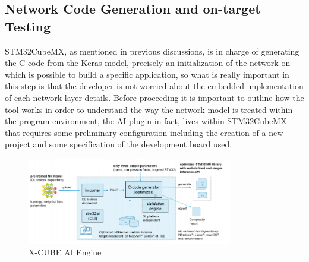 \subsection{Network Code Generation and on-target Testing}
STM32CubeMX, as mentioned in previous discussions, is in charge of generating the C-code from the Keras model, precisely an initialization of the network on which is possible to build a specific application, so what is really important in this step is that the developer is not worried about the embedded implementation of each network layer details.\newline
Before proceeding it is important to outline how the tool works in order to understand the way the network model is treated within the program environment, the AI plugin in fact, lives within STM32CubeMX that requires some preliminary configuration including the creation of a new project and some specification of the development board used.

\begin{figure}[H]
	\hfill\includegraphics[width=0.8\textwidth]{figures/stm32cubeai_arch.png}\hspace*{\fill}
	\caption{X-CUBE AI Engine}\label{fig:20}
\end{figure}

